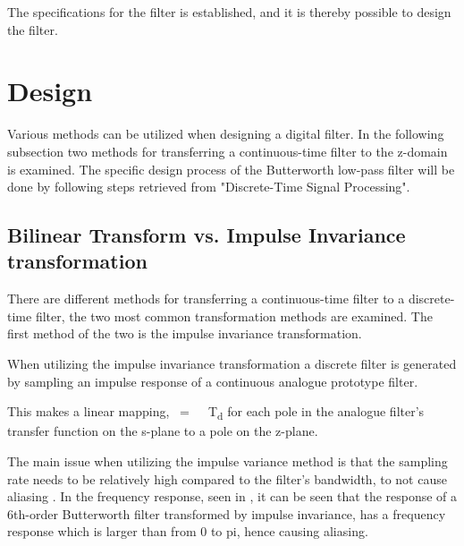 The specifications for the filter is established, and it is thereby possible to design the filter.

\section{Design}
Various methods can be utilized when designing a digital filter. In the following subsection two methods for transferring a continuous-time filter to the z-domain is examined. The specific design process of the Butterworth low-pass filter will be done by following steps retrieved from "Discrete-Time Signal Processing"\cite{AVOppenheim}.

\subsection{Bilinear Transform vs. Impulse Invariance transformation}
There are different methods for transferring a continuous-time filter to a discrete-time filter, the two most common transformation methods are examined. The first method of the two is the impulse invariance transformation.

When utilizing the impulse invariance transformation a discrete filter is generated by sampling an impulse response of a continuous analogue prototype filter\cite{AVOppenheim}.

This makes a linear mapping, \si{\omega = \Omega \cdot T_d} for each pole in the analogue filter's transfer function on the s-plane to a pole on the z-plane. 

The main issue when utilizing the impulse variance method is that the sampling rate needs to be relatively high compared to the filter's bandwidth, to not cause aliasing \cite{LyonsR.G}. In the frequency response, seen in , it can be seen that the response of a 6th-order Butterworth filter transformed by impulse invariance, has a frequency response which is larger than from 0 to \si{pi}, hence causing aliasing\cite{AVOppenheim}.


